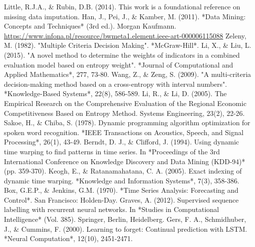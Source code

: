 \documentclass[12pt]{article}  %
\begin{document}
\begin{spacing}{0.01}
\begin{thebibliography}{99}
     Little, R.J.A., \& Rubin, D.B. (2014). This work is a foundational reference on missing data imputation.
     Han, J., Pei, J., \& Kamber, M. (2011). *Data Mining: Concepts and Techniques* (3rd ed.). Morgan Kaufmann.
     \url{https://www.infona.pl/resource/bwmeta1.element.ieee-art-000006115088}
     Zeleny, M. (1982). "Multiple Criteria Decision Making". *McGraw-Hill*.
     Li, X., \& Liu, L. (2015). "A novel method to determine the weights of indicators in a combined evaluation model based on entropy weight". *Journal of Computational and Applied Mathematics*, 277, 73-80.
     Wang, Z., \& Zeng, S. (2009). "A multi-criteria decision-making method based on a cross-entropy with interval numbers". *Knowledge-Based Systems*, 22(8), 586-589.
     Li, R., \& Li, D. (2005). The Empirical Research on the Comprehensive Evaluation of the Regional Economic Competitiveness Based on Entropy Method. Systems Engineering, 23(2), 22-26.
     Sakoe, H., \& Chiba, S. (1978). Dynamic programming algorithm optimization for spoken word recognition. *IEEE Transactions on Acoustics, Speech, and Signal Processing*, 26(1), 43-49. 
     Berndt, D. J., \& Clifford, J. (1994). Using dynamic time warping to find patterns in time series. In *Proceedings of the 3rd International Conference on Knowledge Discovery and Data Mining (KDD-94)* (pp. 359-370).
     Keogh, E., \& Ratanamahatana, C. A. (2005). Exact indexing of dynamic time warping. *Knowledge and Information Systems*, 7(3), 358-386.
     Box, G.E.P., \& Jenkins, G.M. (1970). *Time Series Analysis: Forecasting and Control*. San Francisco: Holden-Day.
     Graves, A. (2012). Supervised sequence labelling with recurrent neural networks. In *Studies in Computational Intelligence* (Vol. 385). Springer, Berlin, Heidelberg.
     Gers, F. A., Schmidhuber, J., \& Cummins, F. (2000). Learning to forget: Continual prediction with LSTM. *Neural Computation*, 12(10), 2451-2471.

\end{thebibliography}
\end{spacing}

\newpage
\end{document}
